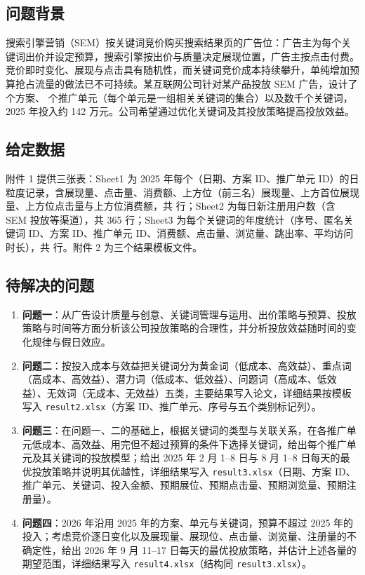 \subsection{问题背景}
搜索引擎营销（SEM）按关键词竞价购买搜索结果页的广告位：广告主为每个关键词出价并设定预算，搜索引擎按出价与质量决定展现位置，广告主按点击付费。竞价即时变化、展现与点击具有随机性，而关键词竞价成本持续攀升，单纯增加预算抢占流量的做法已不可持续。某互联网公司针对某产品投放 SEM 广告，设计了 \valPlansCount{} 个方案、\valUnitsCount{} 个推广单元（每个单元是一组相关关键词的集合）以及数千个关键词，2025 年投入约 142 万元。公司希望通过优化关键词及其投放策略提高投放效益。

\subsection{给定数据}
附件 1 提供三张表：Sheet1 为 2025 年每个（日期、方案 ID、推广单元 ID）的日粒度记录，含展现量、点击量、消费额、上方位（前三名）展现量、上方首位展现量、上方位点击量与上方位消费额，共 \valUnitDays{} 行；Sheet2 为每日新注册用户数（含 SEM 投放等渠道），共 365 行；Sheet3 为每个关键词的年度统计（序号、匿名关键词 ID、方案 ID、推广单元 ID、消费额、点击量、浏览量、跳出率、平均访问时长），共 \valKeywordRows{} 行。附件 2 为三个结果模板文件。

\subsection{待解决的问题}
\begin{enumerate}[leftmargin=2em,itemsep=1pt]
\item \textbf{问题一}：从广告设计质量与创意、关键词管理与运用、出价策略与预算、投放策略与时间等方面分析该公司投放策略的合理性，并分析投放效益随时间的变化规律与假日效应。
\item \textbf{问题二}：按投入成本与效益把关键词分为黄金词（低成本、高效益）、重点词（高成本、高效益）、潜力词（低成本、低效益）、问题词（高成本、低效益）、无效词（无成本、无效益）五类，主要结果写入论文，详细结果按模板写入 \texttt{result2.xlsx}（方案 ID、推广单元、序号与五个类别标记列）。
\item \textbf{问题三}：在问题一、二的基础上，根据关键词的类型与关联关系，在各推广单元低成本、高效益、用完但不超过预算的条件下选择关键词，给出每个推广单元及其关键词的投放模型；给出 2025 年 2 月 1--8 日与 8 月 1--8 日每天的最优投放策略并说明其优越性，详细结果写入 \texttt{result3.xlsx}（日期、方案 ID、推广单元、关键词、投入金额、预期展位、预期点击量、预期浏览量、预期注册量）。
\item \textbf{问题四}：2026 年沿用 2025 年的方案、单元与关键词，预算不超过 2025 年的投入；考虑竞价逐日变化以及展现量、展现位、点击量、浏览量、注册量的不确定性，给出 2026 年 9 月 11--17 日每天的最优投放策略，并估计上述各量的期望范围，详细结果写入 \texttt{result4.xlsx}（结构同 \texttt{result3.xlsx}）。
\end{enumerate}
